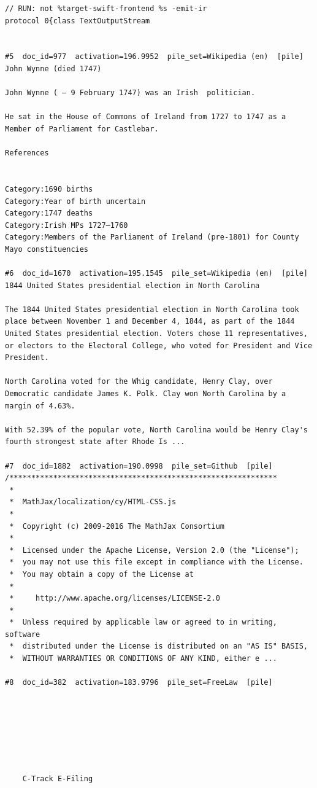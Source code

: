 \begin{verbatim}
// RUN: not %target-swift-frontend %s -emit-ir
protocol 0{class TextOutputStream


#5  doc_id=977  activation=196.9952  pile_set=Wikipedia (en)  [pile]
John Wynne (died 1747)

John Wynne ( – 9 February 1747) was an Irish  politician.

He sat in the House of Commons of Ireland from 1727 to 1747 as a Member of Parliament for Castlebar.

References 
 

Category:1690 births
Category:Year of birth uncertain
Category:1747 deaths
Category:Irish MPs 1727–1760
Category:Members of the Parliament of Ireland (pre-1801) for County Mayo constituencies

#6  doc_id=1670  activation=195.1545  pile_set=Wikipedia (en)  [pile]
1844 United States presidential election in North Carolina

The 1844 United States presidential election in North Carolina took place between November 1 and December 4, 1844, as part of the 1844 United States presidential election. Voters chose 11 representatives, or electors to the Electoral College, who voted for President and Vice President.

North Carolina voted for the Whig candidate, Henry Clay, over Democratic candidate James K. Polk. Clay won North Carolina by a margin of 4.63%.

With 52.39% of the popular vote, North Carolina would be Henry Clay's fourth strongest state after Rhode Is ...

#7  doc_id=1882  activation=190.0998  pile_set=Github  [pile]
/*************************************************************
 *
 *  MathJax/localization/cy/HTML-CSS.js
 *
 *  Copyright (c) 2009-2016 The MathJax Consortium
 *
 *  Licensed under the Apache License, Version 2.0 (the "License");
 *  you may not use this file except in compliance with the License.
 *  You may obtain a copy of the License at
 *
 *     http://www.apache.org/licenses/LICENSE-2.0
 *
 *  Unless required by applicable law or agreed to in writing, software
 *  distributed under the License is distributed on an "AS IS" BASIS,
 *  WITHOUT WARRANTIES OR CONDITIONS OF ANY KIND, either e ...

#8  doc_id=382  activation=183.9796  pile_set=FreeLaw  [pile]



    



	C-Track E-Filing
	

\end{verbatim}

